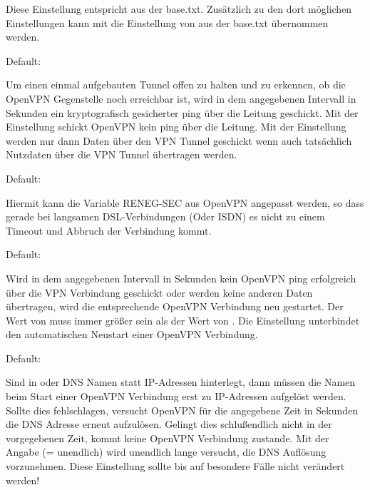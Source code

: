 \begin{description}
  Diese Einstellung entspricht
   aus der
  base.txt. Zusätzlich zu den dort möglichen Einstellungen kann mit
   die Einstellung von  aus der
  base.txt übernommen werden.


  Default: 

  Um einen einmal aufgebauten Tunnel offen zu halten und zu erkennen,
  ob die OpenVPN Gegenstelle noch erreichbar ist, wird in dem
  angegebenen Intervall in Sekunden ein kryptografisch gesicherter
  ping über die Leitung geschickt. Mit der Einstellung 
  schickt OpenVPN kein ping über die Leitung. Mit der Einstellung
   werden nur dann Daten über den VPN Tunnel geschickt wenn
  auch tatsächlich Nutzdaten über die VPN Tunnel übertragen werden.


  Default: 

  Hiermit kann die Variable RENEG-SEC aus OpenVPN angepasst werden,
  so dass gerade bei langsamen DSL-Verbindungen (Oder ISDN) es nicht
  zu einem Timeout und Abbruch der Verbindung kommt.


  Default: 

  Wird in dem angegebenen Intervall in Sekunden kein OpenVPN ping
  erfolgreich über die VPN Verbindung geschickt oder werden keine
  anderen Daten übertragen, wird die entsprechende OpenVPN Verbindung
  neu gestartet. Der Wert von 
  muss immer größer sein als der Wert von
  . Die Einstellung 
  unterbindet den automatischen Neustart einer OpenVPN Verbindung.


  Default: 

  Sind in  oder
   DNS Namen statt IP-Adressen
  hinterlegt, dann müssen die Namen beim Start einer OpenVPN
  Verbindung erst zu IP-Adressen aufgelöst werden.  Sollte dies
  fehlschlagen, versucht OpenVPN für die angegebene Zeit in Sekunden
  die DNS Adresse erneut aufzulösen. Gelingt dies schlußendlich nicht
  in der vorgegebenen Zeit, kommt keine OpenVPN Verbindung zustande.
  Mit der Angabe  (= unendlich) wird unendlich lange
  versucht, die DNS Auflösung vorzunehmen.  Diese Einstellung sollte
  bis auf besondere Fälle nicht verändert werden!


\end{description}
